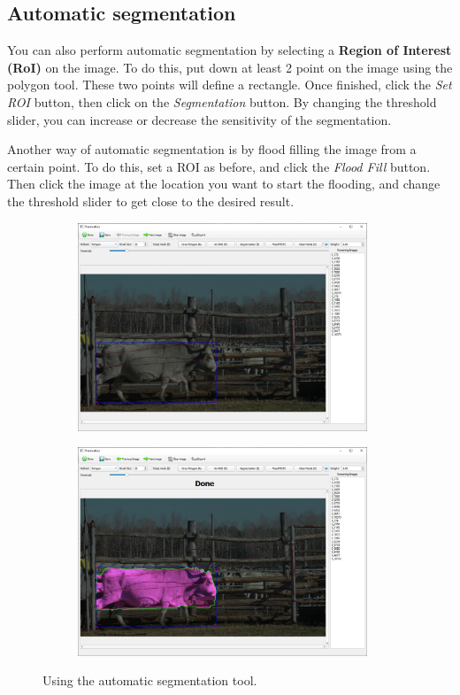 \documentclass[10pt,a4paper,oneside]{report}             %
\begin{document}
\subsection{Automatic segmentation}

You can also perform automatic segmentation by selecting a \textbf{Region of Interest (RoI)} on the image. To do this, put down at least 2 point on the image using the polygon tool. These two points will define a rectangle. Once finished, click the \textit{Set ROI} button, then click on the \textit{Segmentation} button. By changing the threshold slider, you can increase or decrease the sensitivity of the segmentation.

Another way of automatic segmentation is by flood filling the image from a certain point. To do this, set a ROI as before, and click the \textit{Flood Fill} button. Then click the image at the location you want to start the flooding, and change the threshold slider to get close to the desired result.

\begin{figure}[H]
	\centering
	\begin{subfigure}{\textwidth}
		\centering 
		\includegraphics[width=0.95\textwidth]{./images/PlaniROI.jpg}
	\end{subfigure}
	\begin{subfigure}{\textwidth}
		\centering 
		\includegraphics[width=0.95\textwidth]{./images/PlaniSeg.jpg}
	\end{subfigure}
	\caption[]
	{\small  Using the automatic segmentation tool.}
\end{figure} 
\end{document}
